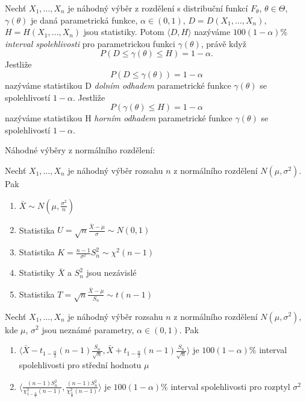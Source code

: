 \begin{definition}
Nechť $X_1,\ldots,X_n$ je náhodný výběr z rozdělení s distribuční funkcí $F_{\theta}$, $\theta \in \Theta$, $ \gamma \left(\theta \right)$ je daná parametrická funkce, $\alpha \in \left(0,1 \right)$, $D=D \left(X_1,\ldots,X_n \right)$, $H=H \left(X_1,\ldots,X_n \right)$ jsou statistiky. Potom $\langle D,H \rangle$ nazýváme $100(1-\alpha)\%$ \textit{interval spolehlivosti} pro parametrickou funkci $\gamma \left(\theta \right)$, právě když $$P\left(D \leq \gamma \left(\theta \right) \leq H \right) = 1-\alpha.$$ Jestliže  $$P\left(D \leq \gamma \left(\theta \right) \right) = 1-\alpha$$ nazýváme statistikou D \textit{dolním odhadem} parametrické funkce $\gamma \left(\theta \right)$ se spolehlivostí $1-\alpha$. Jestliže  $$P\left( \gamma \left(\theta \right) \leq H \right) = 1-\alpha$$ nazýváme statistikou H \textit{horním odhadem} parametrické funkce $\gamma \left(\theta \right)$ se spolehlivostí $1-\alpha$. 
\end{definition}

Náhodné výběry z normálního rozdělení:
\begin{theorem}
Nechť $X_1,\ldots,X_n$ je náhodný výběr rozsahu $n$ z normálního rozdělení $N\left(\mu,\sigma^2 \right)$. Pak \begin{enumerate}
\item $\bar{X} \sim N\left(\mu,\frac{\sigma^2}{n} \right)$
\item Statistika $U = \sqrt{n}\frac{\bar{X}-\mu}{\sigma} \sim N\left(0,1 \right)$
\item Statistika $K = \frac{n-1}{\sigma^2} S_{n}^{2} \sim \chi^2 \left(n-1 \right)$
\item Statistiky $\bar{X}$ a $S_{n}^{2}$ jsou nezávislé
\item Statistika $T = \sqrt{n}\frac{\bar{X}-\mu}{S_n} \sim t\left(n-1 \right)$
\end{enumerate}
\end{theorem}

\begin{dusledek}
Nechť $X_1,\ldots,X_n$ je náhodný výběr rozsahu $n$ z normálního rozdělení $N\left(\mu,\sigma^2 \right)$, kde $\mu$, $\sigma^2$ jsou neznámé parametry, $\alpha \in \left(0,1 \right)$. Pak \begin{enumerate}
\item $\langle \bar{X} - t_{1-\frac{\alpha}{2}} \left(n-1 \right)\frac{S_n}{\sqrt{n}}, \bar{X} + t_{1-\frac{\alpha}{2}} \left(n-1 \right)\frac{S_n}{\sqrt{n}} \rangle$ je $100\left(1-\alpha \right)\%$ interval spolehlivosti pro střední hodnotu $\mu$
\item $\langle \frac{\left(n-1 \right) S_{n}^{2}}{\chi_{1-\frac{\alpha}{2}}^{2} \left(n-1 \right)}, \frac{\left(n-1 \right) S_{n}^{2}}{\chi_{\frac{\alpha}{2}}^{2} \left(n-1 \right)} \rangle$ je $100\left(1-\alpha \right)\%$ interval spolehlivosti pro rozptyl $\sigma^2$
\end{enumerate} 
\end{dusledek}

